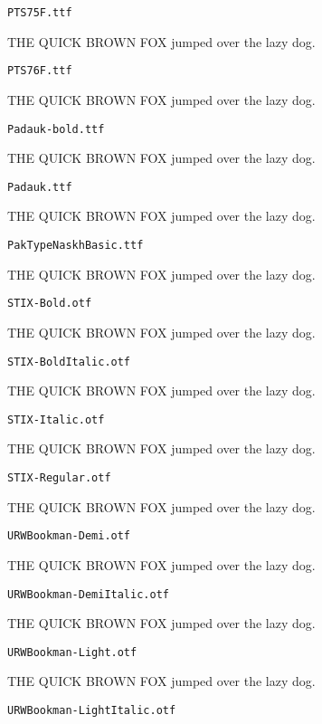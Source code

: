 \documentclass{article}
\begin{document}
\setmainfont[Extension=.ttf]{PTS75F}
\noindent \verb!PTS75F.ttf!

THE QUICK BROWN FOX jumped over the lazy dog.

\setmainfont[Extension=.ttf]{PTS76F}
\noindent \verb!PTS76F.ttf!

THE QUICK BROWN FOX jumped over the lazy dog.

\setmainfont[Extension=.ttf]{Padauk-bold}
\noindent \verb!Padauk-bold.ttf!

THE QUICK BROWN FOX jumped over the lazy dog.

\setmainfont[Extension=.ttf]{Padauk}
\noindent \verb!Padauk.ttf!

THE QUICK BROWN FOX jumped over the lazy dog.

\setmainfont[Extension=.ttf]{PakTypeNaskhBasic}
\noindent \verb!PakTypeNaskhBasic.ttf!

THE QUICK BROWN FOX jumped over the lazy dog.

\setmainfont[Extension=.otf]{STIX-Bold}
\noindent \verb!STIX-Bold.otf!

THE QUICK BROWN FOX jumped over the lazy dog.

\setmainfont[Extension=.otf]{STIX-BoldItalic}
\noindent \verb!STIX-BoldItalic.otf!

THE QUICK BROWN FOX jumped over the lazy dog.

\setmainfont[Extension=.otf]{STIX-Italic}
\noindent \verb!STIX-Italic.otf!

THE QUICK BROWN FOX jumped over the lazy dog.

\setmainfont[Extension=.otf]{STIX-Regular}
\noindent \verb!STIX-Regular.otf!

THE QUICK BROWN FOX jumped over the lazy dog.

\setmainfont[Extension=.otf]{URWBookman-Demi}
\noindent \verb!URWBookman-Demi.otf!

THE QUICK BROWN FOX jumped over the lazy dog.

\setmainfont[Extension=.otf]{URWBookman-DemiItalic}
\noindent \verb!URWBookman-DemiItalic.otf!

THE QUICK BROWN FOX jumped over the lazy dog.

\setmainfont[Extension=.otf]{URWBookman-Light}
\noindent \verb!URWBookman-Light.otf!

THE QUICK BROWN FOX jumped over the lazy dog.

\setmainfont[Extension=.otf]{URWBookman-LightItalic}
\noindent \verb!URWBookman-LightItalic.otf!
\end{document}
